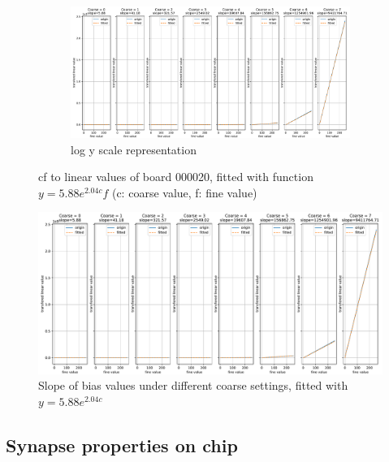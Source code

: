 \begin{figure}
	\begin{subfigure}{\textwidth}
		\centering
		\includegraphics[page=3, width=\columnwidth]{./img/implementation/cf2linear.pdf}
		\caption{log y scale representation}
		\label{fig:cf2l_log}
	\end{subfigure}
	
	\caption{cf to linear values of board 000020, fitted with function $y=5.88e^{2.04c}f$ (c: coarse value, f: fine value)}
	\label{fig:cf2l}
\end{figure}

\begin{figure}
	\centering
	\includegraphics[page=4, width=\columnwidth]{./img/implementation/cf2linear.pdf}
	\caption{Slope of bias values under different coarse settings, fitted with $y=5.88e^{2.04c}$}
	\label{fig:c2f_slopes}
\end{figure}


\subsection{Synapse properties on chip}

